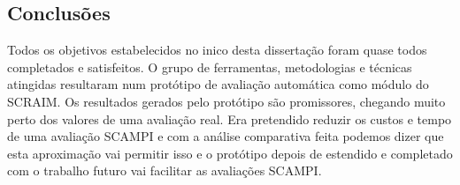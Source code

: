 \documentclass[9pt,a4paper]{extarticle}
\begin{document}
\begin{multicols}{2}
\subsection{Conclusões}

Todos os objetivos estabelecidos no inico desta dissertação foram quase todos completados e satisfeitos. O grupo de ferramentas, metodologias e técnicas atingidas resultaram num protótipo de avaliação automática como módulo do SCRAIM.
Os resultados gerados pelo protótipo são promissores, chegando muito perto dos valores de uma avaliação real. Era pretendido reduzir os custos e tempo de uma avaliação SCAMPI e com a análise comparativa feita podemos dizer que esta aproximação vai permitir isso e o protótipo depois de estendido e completado com o trabalho futuro vai facilitar as avaliações SCAMPI.





\end{multicols}
\end{document}
